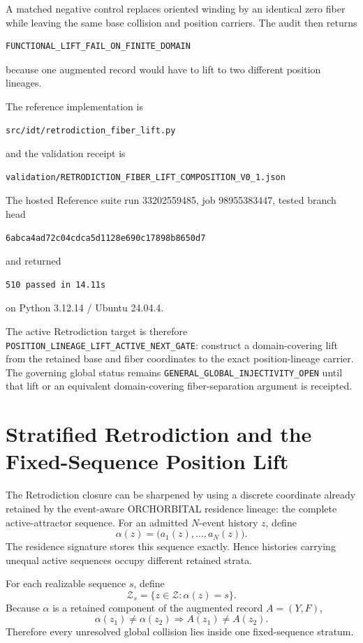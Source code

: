 \documentclass[11pt]{book}
\begin{document}
A matched negative control replaces oriented winding by an identical zero fiber while leaving the same base collision and position carriers.  The audit then returns
\begin{verbatim}
FUNCTIONAL_LIFT_FAIL_ON_FINITE_DOMAIN
\end{verbatim}
because one augmented record would have to lift to two different position lineages.

The reference implementation is
\begin{verbatim}
src/idt/retrodiction_fiber_lift.py
\end{verbatim}
and the validation receipt is
\begin{verbatim}
validation/RETRODICTION_FIBER_LIFT_COMPOSITION_V0_1.json
\end{verbatim}
The hosted Reference suite run 33202559485, job 98955383447, tested branch head
\begin{verbatim}
6abca4ad72c04cdca5d1128e690c17898b8650d7
\end{verbatim}
and returned
\begin{verbatim}
510 passed in 14.11s
\end{verbatim}
on Python 3.12.14 / Ubuntu 24.04.4.

The active Retrodiction target is therefore \texttt{POSITION\_LINEAGE\_LIFT\_ACTIVE\_NEXT\_GATE}: construct a domain-covering lift from the retained base and fiber coordinates to the exact position-lineage carrier.  The governing global status remains \texttt{GENERAL\_GLOBAL\_INJECTIVITY\_OPEN} until that lift or an equivalent domain-covering fiber-separation argument is receipted.

\chapter{Stratified Retrodiction and the Fixed-Sequence Position Lift}
\label{chap:stratified-position-lift}

The Retrodiction closure can be sharpened by using a discrete coordinate already retained by the event-aware ORCHORBITAL residence lineage: the complete active-attractor sequence. For an admitted $N$-event history $z$, define
\[
\alpha(z)=\bigl(a_1(z),\ldots,a_N(z)\bigr).
\]
The residence signature stores this sequence exactly. Hence histories carrying unequal active sequences occupy different retained strata.

For each realizable sequence $s$, define
\[
\mathcal Z_s=\{z\in\mathcal Z:\alpha(z)=s\}.
\]
Because $\alpha$ is a retained component of the augmented record $A=(Y,F)$,
\[
\alpha(z_1)\neq\alpha(z_2)
\Longrightarrow
A(z_1)\neq A(z_2).
\]
Therefore every unresolved global collision lies inside one fixed-sequence stratum.
\end{document}
